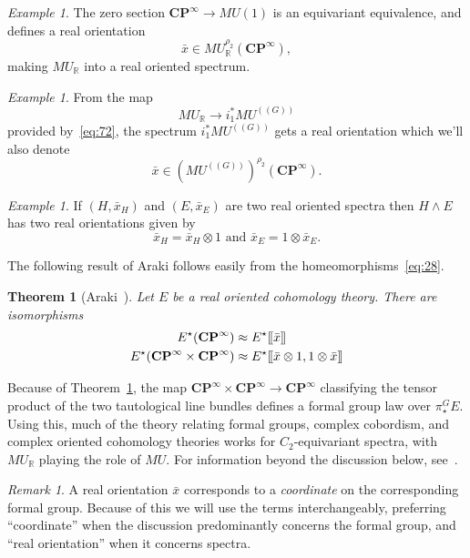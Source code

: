 \documentclass{amsart}
\newtheorem{thm}[equation]{Theorem}
\newtheorem{rem}[equation]{Remark}
\theoremstyle{definition}
\theoremstyle{remark}
\newtheorem{rem}[equation]{Remark}
\newtheorem{eg}[equation]{Example}
\newcommand{\R}{{\mathbb R}}
\newcommand{\LL}{[\mkern-2mu[}
\newcommand{\RR}{]\mkern-2mu]}
\newcommand{\cp}{\mathbf{CP}}
\newcommand{\mur}{MU_{\R}}
\newcommand{\mutn}[1]{MU^{(\!(#1)\!)}}
\newcommand{\gbar}{\bar}
\newcommand{\zt}{C_{2}}
\begin{document}
\begin{eg}
\label{eg:16}
The zero section $\cp^{\infty}\to MU(1)$ is an equivariant
equivalence, and defines a real orientation
\[
\gbar{x}\in \mur^{\rho_{2}}(\cp^{\infty}),
\]
making $\mur$ into a real oriented spectrum.
\end{eg}

\begin{eg}
\label{eg:18}
From the map
\[
\mur\to i_{1}^{\ast}\mutn{G}
\]
provided by~\eqref{eq:72}, the spectrum $i_{1}^{\ast}\mutn{G}$ gets a
real orientation which we'll also denote
\[
\gbar{x} \in ({\mutn{G}})^{\rho_{2}}(\cp^{\infty}).
\]
\end{eg}

\begin{eg}
\label{eg:19}
If
$(H,\gbar{x}_{H})$ and $(E,\gbar{x}_{E})$ are two real oriented
spectra then $H\wedge E$ has two real orientations given by
\[
\gbar{x}_{H} = \gbar{x}_{H}\otimes 1\text{ and } \gbar{x}_{E} =
1\otimes \gbar{x}_{E}.
\]
\end{eg}

The following result of Araki follows easily from the
homeomorphisms~\eqref{eq:28}.

\begin{thm}[Araki~\cite{MR614829}]
\label{thm:107}
Let $E$ be a real oriented cohomology theory.  There are isomorphisms
\begin{align*}
E^{\star}(\cp^{\infty}) &\approx E^{\star}\LL \gbar{x}\RR \\
E^{\star}(\cp^{\infty}\times \cp^{\infty}) &\approx E^{\star}\LL \gbar{x}\otimes 1, 1\otimes \gbar{x}\RR \\
\end{align*}
\end{thm}

Because of Theorem~\ref{thm:107}, the map
$\cp^{\infty}\times\cp^{\infty}\to\cp^{\infty}$ classifying the tensor
product of the two tautological line bundles defines a formal group
law over $\pi^{G}_{\star}E$.  Using this, much of the theory relating
formal groups, complex cobordism, and complex oriented cohomology
theories works for $\zt$-equivariant spectra, with $\mur$ playing the
role of $MU$.  For information beyond the discussion below,
see~\cite{MR614829,MR1808224}.

\begin{rem}
\label{rem:58} 
A real orientation $\gbar{x}$ corresponds to a {\em
coordinate} on the corresponding formal group.  Because of this we
will use the terms interchangeably, preferring ``coordinate'' when the
discussion predominantly concerns the formal group, and ``real
orientation'' when it concerns spectra.
\end{rem}
\end{document}
